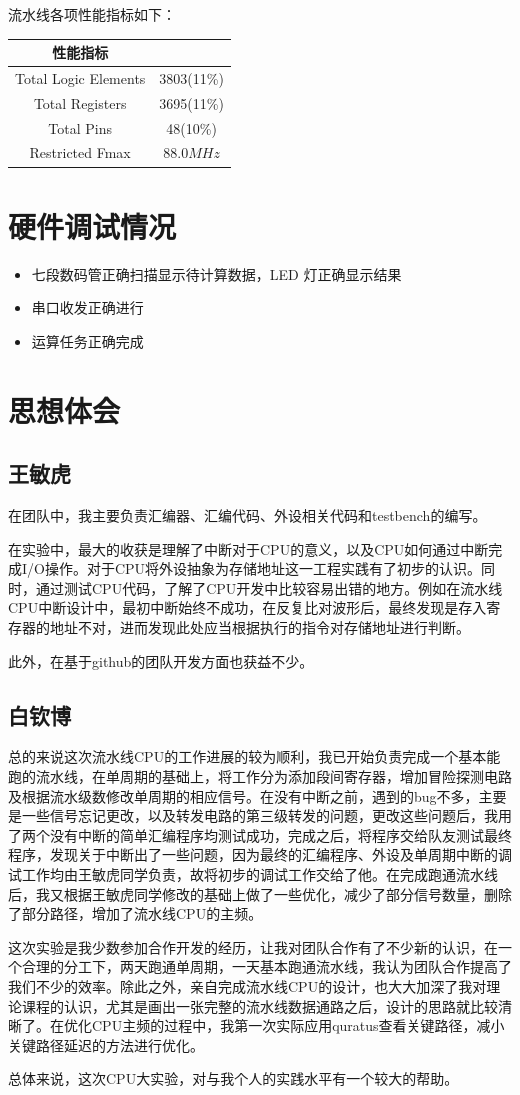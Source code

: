 \documentclass{ctexart}
\begin{document}
	流水线各项性能指标如下：
	\begin{center}
		\begin{tabular}{|c|c|}
		\hline
		性能指标 & \\
		\hline
		Total Logic Elements & 3803(11\%) \\
		Total Registers & 3695(11\%) \\
		Total Pins & 48(10\%) \\
		Restricted Fmax & $88.0 MHz$ \\  
		\hline
		\end{tabular}
	\end{center}
	\section{硬件调试情况}
\begin{itemize}
	\item  七段数码管正确扫描显示待计算数据，LED 灯正确显示结果
	\item  串口收发正确进行
	\item  运算任务正确完成 
\end{itemize}
	\section{思想体会}

	\subsection{王敏虎}

	在团队中，我主要负责汇编器、汇编代码、外设相关代码和testbench的编写。

	在实验中，最大的收获是理解了中断对于CPU的意义，以及CPU如何通过中断完成I/O操作。对于CPU将外设抽象为存储地址这一工程实践有了初步的认识。同时，通过测试CPU代码，了解了CPU开发中比较容易出错的地方。例如在流水线CPU中断设计中，最初中断始终不成功，在反复比对波形后，最终发现是存入寄存器的地址不对，进而发现此处应当根据执行的指令对存储地址进行判断。

	此外，在基于github的团队开发方面也获益不少。

	\subsection{白钦博}

	总的来说这次流水线CPU的工作进展的较为顺利，我已开始负责完成一个基本能跑的流水线，在单周期的基础上，将工作分为添加段间寄存器，增加冒险探测电路及根据流水级数修改单周期的相应信号。在没有中断之前，遇到的bug不多，主要是一些信号忘记更改，以及转发电路的第三级转发的问题，更改这些问题后，我用了两个没有中断的简单汇编程序均测试成功，完成之后，将程序交给队友测试最终程序，发现关于中断出了一些问题，因为最终的汇编程序、外设及单周期中断的调试工作均由王敏虎同学负责，故将初步的调试工作交给了他。在完成跑通流水线后，我又根据王敏虎同学修改的基础上做了一些优化，减少了部分信号数量，删除了部分路径，增加了流水线CPU的主频。

	这次实验是我少数参加合作开发的经历，让我对团队合作有了不少新的认识，在一个合理的分工下，两天跑通单周期，一天基本跑通流水线，我认为团队合作提高了我们不少的效率。除此之外，亲自完成流水线CPU的设计，也大大加深了我对理论课程的认识，尤其是画出一张完整的流水线数据通路之后，设计的思路就比较清晰了。在优化CPU主频的过程中，我第一次实际应用quratus查看关键路径，减小关键路径延迟的方法进行优化。
	
	总体来说，这次CPU大实验，对与我个人的实践水平有一个较大的帮助。
\end{document}
